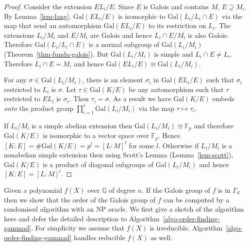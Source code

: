 \documentclass[11pt]{madras}%
\theoremstyle{remark}
\newcommand{\Gal}[1]{{\ensuremath{\mathrm{Gal}\left(#1\right)}}}
\begin{document}
\begin{proof}
  Consider the extension $EL_i/E$. Since $E$ is Galois and contains
  $M$, $E \supseteq M_i$.  By Lemma~\ref{lem-lang}, $\Gal{EL_i/E}$ is
  isomorphic to $\Gal{L_i/L_i \cap E}$ via the map that send an
  automorphism $\Gal{EL_i/E}$ to its restriction on $L_i$. The
  extensions $L_i/M_i$ and $E/M_i$ are Galois and hence $ L_i\cap
  E/M_i$ is also Galois.  Therefore $\Gal{L_i/L_i\cap E}$ is a normal
  subgroup of $\Gal{L_i/M_i}$ (Theorem~\ref{thm-funda-galois}).  But
  $\Gal{L_i/M_i}$ is simple and $L_i \cap E \neq L_i$. Therefore $L_i
  \cap E = M_i$ and hence $\Gal{EL_i/E} \cong \Gal{L_i/M_i}$.

  For any $\sigma \in \Gal{L_i/M_i}$, there is an element $\sigma_i$
  in $\Gal{EL_i/E}$ such that $\sigma_i$ restricted to $L_i$ is
  $\sigma$. Let $\tau \in \Gal{K/E}$ be any automorphism such that
  $\tau$ restricted to $EL_i$ is $\sigma_i$.  Then $\tau_i = \sigma$.
  As a result we have $\Gal{K/E}$ embeds \emph{onto} the product group
  $\prod_{i=1}^r \Gal{L_i/M_i}$ via the map $\tau \mapsto \tau_i$.

  If $L_i/M_i$ is a simple abelian extension then $\Gal{L_i/M_i} \cong
  \mathbb{F}_p$ and therefore $\Gal{K/E}$ is isomorphic to a vector
  space over $\mathbb{F}_p$.  Hence $[K:E] = \# \Gal{K/E} = p^l =
  [L:M]^l$ for some $l$.  Otherwise if $L_i/M_i$ is a nonabelian
  simple extension then using Scott's Lemma (Lemma~\ref{lem-scott}),
  $\Gal{K/E}$ is a product of diagonal subgroups of $\Gal{L_i/M_i}$
  and hence $[K:E] = [L:M]^l$.
\end{proof}


Given a polynomial $f(X)$ over $\mathbb{Q}$ of degree $n$. If the
Galois group of $f$ is in $\Gamma_d$ then we show that the order of
the Galois group of $f$ can be computed by a randomised algorithm with
an $\mathrm{NP}$ oracle. We first give a sketch of the algorithm here
and defer the detailed description to
Algorithm~\ref{algo-order-finding-gammad}. For simplicity we assume
that $f(X)$ is irreducible. Algorithm~\ref{algo-order-finding-gammad}
handles reducible $f(X)$ as well.
\end{document}

